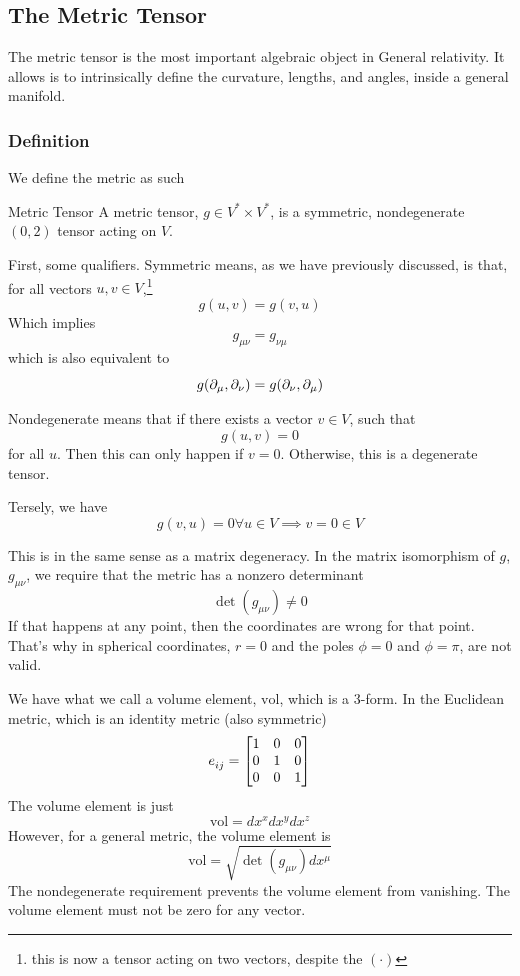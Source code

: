 \subsection{The Metric Tensor}

	The metric tensor is the most important algebraic object in General relativity.
	It allows is to intrinsically define the curvature, lengths, and angles, inside a 
	general manifold. 

\subsubsection{Definition}
	We define the metric as such
	\begin{definition}{Metric Tensor}
		A metric tensor, $g\in V^*\times V^*$, is a symmetric, nondegenerate $(0,2)$ tensor acting on 
		$V$.
	\end{definition}
	

	First, some qualifiers. Symmetric means, as we have previously discussed, is that, for all vectors 
	$u,v\in V$,\footnote{this is now a tensor acting on two vectors, despite the $(\cdot)$}
	\[
		g(u,v) = g(v,u)
	\]
	Which implies
	\[
		g_{\mu\nu} = g_{\nu\mu}
	\]
	which is also equivalent to
	\[
		 g(\partial_\mu,\partial_\nu) = g(\partial_\nu, \partial_\mu)
	\]

	Nondegenerate means that if there exists a vector $v\in V$, such that
	\[
		g(u,v) = 0
	\]
	for all $u$. Then this can only happen if $v = 0$. Otherwise, this is a degenerate tensor.

	Tersely, we have
	\[
		g(v,u) = 0\forall u \in V\implies v=0\in V
	\]

	This is in the same sense as a matrix degeneracy. In the matrix isomorphism
	of $g$, $g_{\mu\nu}$, we require that the metric has a nonzero determinant
	\[
		\det(g_{\mu\nu})\neq 0
	\]
	If that happens at any point, then the coordinates are wrong for that point.
	That's why in spherical coordinates, $r=0$ and the poles $\phi = 0$ and $\phi = \pi$,
	are not valid.

	We have what we call a volume element, $\text{vol}$, which is a 3-form. In the Euclidean metric,
	which is an identity metric (also symmetric)
	\[
		\tensor{e}{_{ij}} = \bmqty{
			1 & 0 & 0 \\
			0 & 1 & 0 \\
			0 & 0 & 1 \\
	} 
	\]
	The volume element is just 
	\[
		\text{vol} = dx^x dx^y dx^z
	\]
	However, for a general metric, the volume element is
	\[
		\text{vol} = \sqrt{\det(g_{\mu\nu}) dx^\mu}
	\]
	The nondegenerate requirement prevents the volume element from vanishing.
	The volume element must not be zero for any vector.

